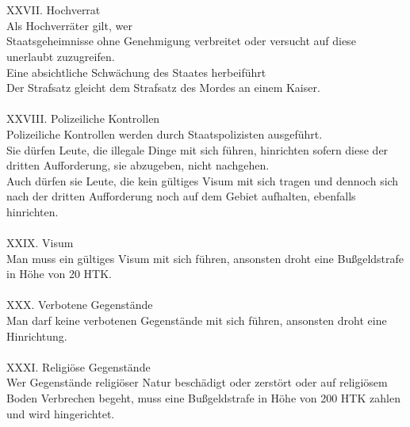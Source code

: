 \documentclass{article}
\begin{document}
\\\\
XXVII. Hochverrat\\Als Hochverräter gilt, wer\\Staatsgeheimnisse ohne Genehmigung verbreitet oder versucht auf diese unerlaubt zuzugreifen.\\Eine absichtliche Schwächung des Staates herbeiführt\\       Der Strafsatz gleicht dem Strafsatz des Mordes an einem Kaiser.
\\\\
XXVIII. Polizeiliche Kontrollen\\Polizeiliche Kontrollen werden durch Staatspolizisten ausgeführt.\\Sie dürfen Leute, die illegale Dinge mit sich führen, hinrichten sofern diese der dritten Aufforderung, sie abzugeben, nicht nachgehen.\\Auch dürfen sie Leute, die kein gültiges Visum mit sich tragen und dennoch sich nach der dritten Aufforderung noch auf dem Gebiet aufhalten, ebenfalls hinrichten.
\\\\
XXIX. Visum\\Man muss ein gültiges Visum mit sich führen, ansonsten droht eine Bußgeldstrafe in Höhe von 20 HTK.
\\\\
XXX. Verbotene Gegenstände\\Man darf keine verbotenen Gegenstände mit sich führen, ansonsten droht eine Hinrichtung.
\\\\
XXXI. Religiöse Gegenstände\\Wer Gegenstände religiöser Natur beschädigt oder zerstört oder auf religiösem Boden Verbrechen begeht, muss eine Bußgeldstrafe in Höhe von 200 HTK zahlen und wird hingerichtet.
\\\\
\end{document}
